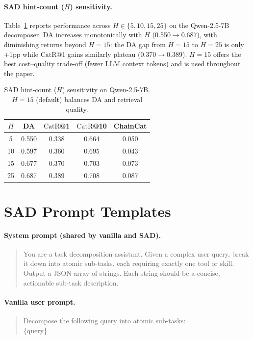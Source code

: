 \documentclass[11pt]{article}
\newcommand{\catrecall}{\text{CatR}}
\begin{document}
\paragraph{SAD hint-count ($H$) sensitivity.}
Table~\ref{tab:h-sensitivity} reports performance across $H \in \{5, 10, 15, 25\}$ on the Qwen-2.5-7B decomposer.
DA increases monotonically with $H$ (0.550$\to$0.687), with diminishing returns beyond $H{=}15$: the DA gap from $H{=}15$ to $H{=}25$ is only +1pp while $\catrecall$@1 gains similarly plateau (0.370$\to$0.389). $H{=}15$ offers the best cost--quality trade-off (fewer LLM context tokens) and is used throughout the paper.

\begin{table}[h]
\centering\small
\begin{tabular}{ccccc}
\toprule
$H$ & DA & $\catrecall$@1 & $\catrecall$@10 & ChainCat \\
\midrule
5  & 0.550 & 0.338 & 0.664 & 0.050 \\
10 & 0.597 & 0.360 & 0.695 & 0.043 \\
15 & 0.677 & 0.370 & 0.703 & 0.073 \\
25 & 0.687 & 0.389 & 0.708 & 0.087 \\
\bottomrule
\end{tabular}
\caption{SAD hint-count ($H$) sensitivity on Qwen-2.5-7B. $H{=}15$ (default) balances DA and retrieval quality.}
\label{tab:h-sensitivity}
\end{table}

\section{SAD Prompt Templates}
\label{app:sad-prompts}

\paragraph{System prompt (shared by vanilla and SAD).}
\begin{quote}
\small\ttfamily
You are a task decomposition assistant. Given a complex user query, break it down into atomic sub-tasks, each requiring exactly one tool or skill. Output a JSON array of strings. Each string should be a concise, actionable sub-task description.
\end{quote}

\paragraph{Vanilla user prompt.}
\begin{quote}
\small\ttfamily
Decompose the following query into atomic sub-tasks:\\ \{query\}
\end{quote}
\end{document}
